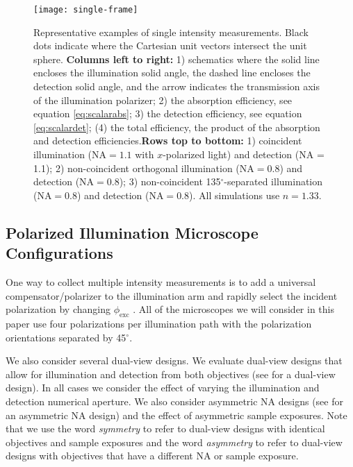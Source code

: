 \documentclass[10pt]{article}
\begin{document}
\begin{figure}[H]
\centering\texttt{[image: single-frame]}
\caption{Representative examples of single intensity measurements. Black dots
  indicate where the Cartesian unit vectors intersect the unit sphere. \newline \newline \textbf{Columns left to right:} 1) schematics where
  the solid line encloses the illumination solid angle, the dashed line encloses
  the detection solid angle, and the arrow indicates the transmission axis of
  the illumination polarizer; 2) the absorption efficiency, see equation
  \ref{eq:scalarabs}; 3) the detection efficiency, see equation
  \ref{eq:scalardet}; (4) the total efficiency, the product of the absorption
  and detection efficiencies.\newline \newline \textbf{Rows top to bottom:} 1)
  coincident illumination ($\text{NA} = 1.1$ with $x$-polarized light) and
  detection (NA = 1.1); 2) non-coincident orthogonal illumination
  ($\text{NA} = 0.8$) and detection ($\text{NA} = 0.8$); 3) non-coincident
  135${}^{\circ}$-separated illumination ($\text{NA} = 0.8$) and detection
  ($\text{NA} = 0.8$). All simulations use $n=1.33$.}
  \label{fig:single-frame}
\end{figure}

\subsection{Polarized Illumination Microscope Configurations}\label{designs}
One way to collect multiple intensity measurements is to add a universal
compensator/polarizer to the illumination arm and rapidly select the incident
polarization by changing $\phi_{\text{exc}}$ \cite{shribak2003}. All of the
microscopes we will consider in this paper use four polarizations per
illumination path with the polarization orientations separated by
45${}^{\circ}$.

We also consider several dual-view designs. We evaluate dual-view designs that
allow for illumination and detection from both objectives (see \cite{wu2013} for
a dual-view design). In all cases we consider the effect of varying the
illumination and detection numerical aperture. We also consider asymmetric NA
designs (see \cite{wu2017} for an asymmetric NA design) and the effect of
asymmetric sample exposures. Note that we use the word \emph{symmetry} to refer
to dual-view designs with identical objectives and sample exposures and the word
\emph{asymmetry} to refer to dual-view designs with objectives that have a
different NA or sample exposure.
\end{document}
